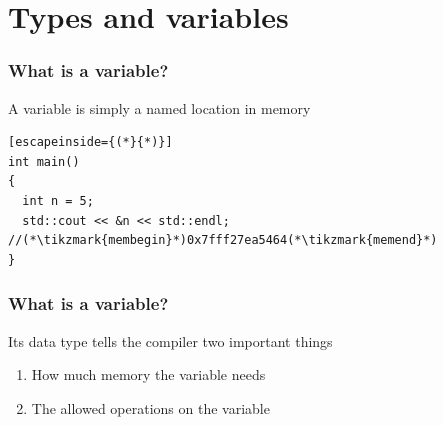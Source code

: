 \documentclass[14pt,a4paper,dvipsnames,usenames]{beamer}
\begin{document}
\section{Types and variables}

\frame[plain]{\sectionpage}

\begin{frame}[fragile]
  \frametitle{What is a variable?}

  A variable is simply a named location in memory

  \bigskip

  \begin{lstlisting}[escapeinside={(*}{*)}]
int main()
{
  int n = 5;
  std::cout << &n << std::endl; //(*\tikzmark{membegin}*)0x7fff27ea5464(*\tikzmark{memend}*)
}
  \end{lstlisting}

 
\end{frame}

\begin{frame}
  \frametitle{What is a variable?}

  Its data type tells the compiler two important things

  \vspace{1em}

  \begin{enumerate}
    \setlength\itemsep{1em}
    \item How much memory the variable needs
    \item The allowed operations on the variable
  \end{enumerate}
\end{frame}
\end{document}
